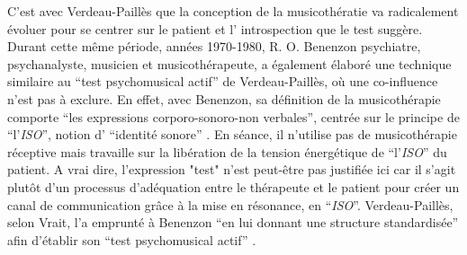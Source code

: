 C'est avec Verdeau-Paillès que la conception de la musicothératie va radicalement évoluer pour se 
centrer sur le patient et l' introspection que le test suggère.
Durant cette même période, années 1970-1980,
 R. O. Benenzon psychiatre, psychanalyste,
musicien et musicothérapeute, a également élaboré une technique similaire au \enquote {test 
psychomusical actif} de Verdeau-Paillès,
 où une co-influence n'est pas à exclure.
 En effet, avec Benenzon, sa définition de la musicothérapie comporte
\enquote{les expressions corporo-sonoro-non
     verbales}, %
centrée sur le principe de \enquote{l'\textit{ISO}}, notion
 d' \enquote{identité sonore} \autocite{benenzon:musicotherapie}.
En séance, il n'utilise pas de
 musicothérapie réceptive mais travaille sur la libération de
 la tension énergétique de \enquote{l'\textit{ISO}} du patient.
A vrai dire, l'expression "test" n'est peut-être pas justifiée ici car il s'agit plutôt d'un processus 
d'adéquation entre le thérapeute et le patient pour créer un canal de communication grâce à la mise en 
résonance, en \enquote{\textit{ISO}}. Verdeau-Paillès, selon Vrait, l'a emprunté à Benenzon  \enquote {en 
lui donnant une structure standardisée} afin d'établir son \enquote {test psychomusical actif} 
\autocite[39]{vrait_musicotherapie_2018}.%
